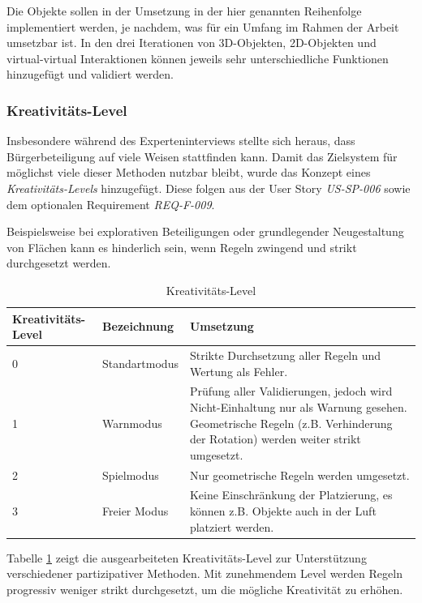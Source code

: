 \medskip

Die Objekte sollen in der Umsetzung in der hier genannten Reihenfolge implementiert werden, je nachdem, was für ein Umfang im Rahmen der Arbeit umsetzbar ist. In den drei Iterationen von 3D-Objekten, 2D-Objekten und virtual-virtual Interaktionen können jeweils sehr unterschiedliche Funktionen hinzugefügt und validiert werden.

\subsubsection{Kreativitäts-Level}

Insbesondere während des Experteninterviews stellte sich heraus, dass Bürgerbeteiligung auf viele Weisen stattfinden kann. Damit das Zielsystem für möglichst viele dieser Methoden nutzbar bleibt, wurde das Konzept eines \textit{Kreativitäts-Levels} hinzugefügt. Diese folgen aus der User Story \textit{US-SP-006} sowie dem optionalen Requirement \textit{REQ-F-009}.

Beispielsweise bei explorativen Beteiligungen oder grundlegender Neugestaltung von Flächen kann es hinderlich sein, wenn Regeln zwingend und strikt durchgesetzt werden. 

\begin{table}[!h]
\begin{center}
    \begin{tabular}{ | p{2cm} | p{3cm} | p{9cm} | }
      \hline
      Kreativitäts-Level & Bezeichnung & Umsetzung \\ \hline \hline
      0 & Standartmodus & Strikte Durchsetzung aller Regeln und Wertung als Fehler. \\ \hline
      1 & Warnmodus & Prüfung aller Validierungen, jedoch wird Nicht-Einhaltung nur als Warnung gesehen. Geometrische Regeln (z.B. Verhinderung der Rotation) werden weiter strikt umgesetzt. \\ \hline
      2 & Spielmodus & Nur geometrische Regeln werden umgesetzt. \\ \hline
      3 & Freier Modus & Keine Einschränkung der Platzierung, es können z.B. Objekte auch in der Luft platziert werden. \\
      \hline
    \end{tabular}
\caption{Kreativitäts-Level}
\label{tab:kreativitaets level}
\end{center}
\end{table}

Tabelle \ref{tab:kreativitaets level} zeigt die ausgearbeiteten Kreativitäts-Level zur Unterstützung verschiedener partizipativer Methoden. Mit zunehmendem Level werden Regeln progressiv weniger strikt durchgesetzt, um die mögliche Kreativität zu erhöhen.

